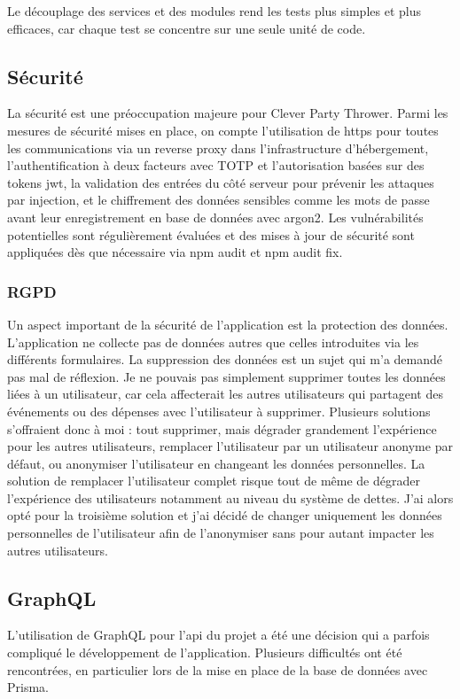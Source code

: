 Le découplage des services et des modules rend les tests plus simples et plus efficaces, car chaque test se concentre sur une seule unité de code.

\subsection{Sécurité}\label{subsec:securite}
La sécurité est une préoccupation majeure pour Clever Party Thrower.
Parmi les mesures de sécurité mises en place, on compte l'utilisation de \Gls{https} pour toutes les communications via un reverse proxy dans l'infrastructure d'hébergement,
l'authentification à deux facteurs avec TOTP et l'autorisation basées sur des tokens \Gls{jwt}, la validation des entrées du côté serveur pour prévenir les attaques par injection,
et le chiffrement des données sensibles comme les mots de passe avant leur enregistrement en base de données avec argon2.
Les vulnérabilités potentielles sont régulièrement évaluées et des mises à jour de sécurité sont appliquées dès que nécessaire via \Gls{npm} audit et \Gls{npm} audit fix.

\subsubsection{RGPD}
Un aspect important de la sécurité de l'application est la protection des données.
L'application ne collecte pas de données autres que celles introduites via les différents formulaires.
La suppression des données est un sujet qui m'a demandé pas mal de réflexion.
Je ne pouvais pas simplement supprimer toutes les données liées à un utilisateur, car cela affecterait les autres utilisateurs qui partagent des événements ou des dépenses avec l'utilisateur à supprimer.
Plusieurs solutions s'offraient donc à moi : tout supprimer, mais dégrader grandement l'expérience pour les autres utilisateurs, remplacer l'utilisateur par un utilisateur anonyme par défaut, ou anonymiser l'utilisateur en changeant les données personnelles.
La solution de remplacer l'utilisateur complet risque tout de même de dégrader l'expérience des utilisateurs notamment au niveau du système de dettes.
J'ai alors opté pour la troisième solution et j'ai décidé de changer uniquement les données personnelles de l'utilisateur afin de l'anonymiser sans pour autant impacter les autres utilisateurs.

\subsection{GraphQL}\label{subsec:graphql}
L'utilisation de GraphQL pour l'\Gls{api} du projet a été une décision qui a parfois compliqué le développement de l'application.
Plusieurs difficultés ont été rencontrées, en particulier lors de la mise en place de la base de données avec Prisma.\\

